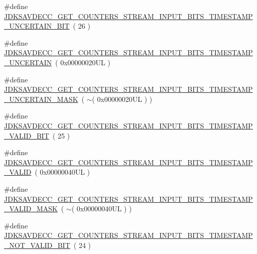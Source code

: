 \begin{DoxyCompactItemize}
\item 
\#define \hyperlink{group__get__counters__stream__input__bits_ga986006b8ad3ccf4bee2d38f3a1718d6e}{J\+D\+K\+S\+A\+V\+D\+E\+C\+C\+\_\+\+G\+E\+T\+\_\+\+C\+O\+U\+N\+T\+E\+R\+S\+\_\+\+S\+T\+R\+E\+A\+M\+\_\+\+I\+N\+P\+U\+T\+\_\+\+B\+I\+T\+S\+\_\+\+T\+I\+M\+E\+S\+T\+A\+M\+P\+\_\+\+U\+N\+C\+E\+R\+T\+A\+I\+N\+\_\+\+B\+IT}~( 26 )
\item 
\#define \hyperlink{group__get__counters__stream__input__bits_ga149adf21ba011859ad17475ecaefd84c}{J\+D\+K\+S\+A\+V\+D\+E\+C\+C\+\_\+\+G\+E\+T\+\_\+\+C\+O\+U\+N\+T\+E\+R\+S\+\_\+\+S\+T\+R\+E\+A\+M\+\_\+\+I\+N\+P\+U\+T\+\_\+\+B\+I\+T\+S\+\_\+\+T\+I\+M\+E\+S\+T\+A\+M\+P\+\_\+\+U\+N\+C\+E\+R\+T\+A\+IN}~( 0x00000020\+U\+L )
\item 
\#define \hyperlink{group__get__counters__stream__input__bits_gae304da85087e5507c17ac4f251c17a97}{J\+D\+K\+S\+A\+V\+D\+E\+C\+C\+\_\+\+G\+E\+T\+\_\+\+C\+O\+U\+N\+T\+E\+R\+S\+\_\+\+S\+T\+R\+E\+A\+M\+\_\+\+I\+N\+P\+U\+T\+\_\+\+B\+I\+T\+S\+\_\+\+T\+I\+M\+E\+S\+T\+A\+M\+P\+\_\+\+U\+N\+C\+E\+R\+T\+A\+I\+N\+\_\+\+M\+A\+SK}~( $\sim$( 0x00000020\+U\+L ) )
\item 
\#define \hyperlink{group__get__counters__stream__input__bits_gab2b4b8a5602008c95c14d287a0f0f102}{J\+D\+K\+S\+A\+V\+D\+E\+C\+C\+\_\+\+G\+E\+T\+\_\+\+C\+O\+U\+N\+T\+E\+R\+S\+\_\+\+S\+T\+R\+E\+A\+M\+\_\+\+I\+N\+P\+U\+T\+\_\+\+B\+I\+T\+S\+\_\+\+T\+I\+M\+E\+S\+T\+A\+M\+P\+\_\+\+V\+A\+L\+I\+D\+\_\+\+B\+IT}~( 25 )
\item 
\#define \hyperlink{group__get__counters__stream__input__bits_gadbb632f89a8ce22bed92f5e0e3f12907}{J\+D\+K\+S\+A\+V\+D\+E\+C\+C\+\_\+\+G\+E\+T\+\_\+\+C\+O\+U\+N\+T\+E\+R\+S\+\_\+\+S\+T\+R\+E\+A\+M\+\_\+\+I\+N\+P\+U\+T\+\_\+\+B\+I\+T\+S\+\_\+\+T\+I\+M\+E\+S\+T\+A\+M\+P\+\_\+\+V\+A\+L\+ID}~( 0x00000040\+U\+L )
\item 
\#define \hyperlink{group__get__counters__stream__input__bits_ga381857b14bef0bce4bede78a6a9b94e2}{J\+D\+K\+S\+A\+V\+D\+E\+C\+C\+\_\+\+G\+E\+T\+\_\+\+C\+O\+U\+N\+T\+E\+R\+S\+\_\+\+S\+T\+R\+E\+A\+M\+\_\+\+I\+N\+P\+U\+T\+\_\+\+B\+I\+T\+S\+\_\+\+T\+I\+M\+E\+S\+T\+A\+M\+P\+\_\+\+V\+A\+L\+I\+D\+\_\+\+M\+A\+SK}~( $\sim$( 0x00000040\+U\+L ) )
\item 
\#define \hyperlink{group__get__counters__stream__input__bits_ga7e5fec035845bafa59d4fd50c35672f1}{J\+D\+K\+S\+A\+V\+D\+E\+C\+C\+\_\+\+G\+E\+T\+\_\+\+C\+O\+U\+N\+T\+E\+R\+S\+\_\+\+S\+T\+R\+E\+A\+M\+\_\+\+I\+N\+P\+U\+T\+\_\+\+B\+I\+T\+S\+\_\+\+T\+I\+M\+E\+S\+T\+A\+M\+P\+\_\+\+N\+O\+T\+\_\+\+V\+A\+L\+I\+D\+\_\+\+B\+IT}~( 24 )

\end{DoxyCompactItemize}
